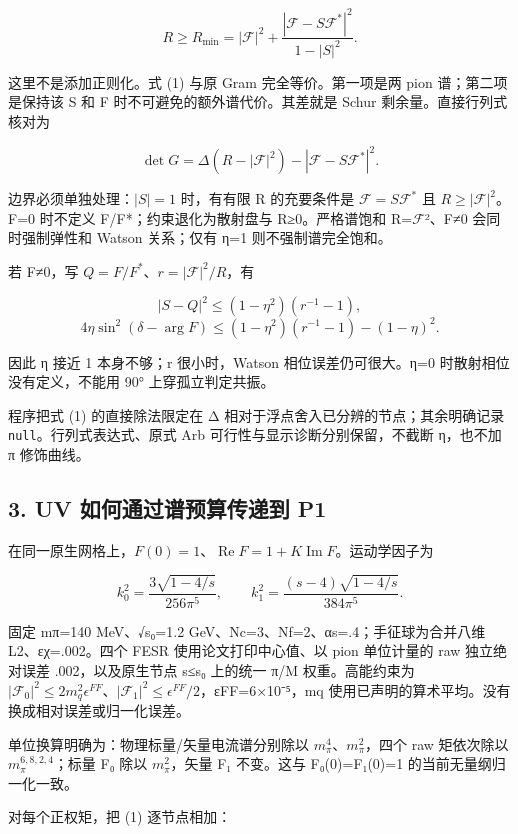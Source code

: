 \documentclass[
  11pt,
  a4paper,
]{article}
\begin{document}
\[
\boxed{R\ge R_{\min}=|\mathcal F|^2+
\frac{|\mathcal F-S\mathcal F^*|^2}{1-|S|^2}.}
\tag{1}
\]

这里不是添加正则化。式 (1) 与原 Gram 完全等价。第一项是两 pion
谱；第二项是保持该 S 和 F 时不可避免的额外谱代价。其差就是 Schur
剩余量。直接行列式核对为

\[
\det G=\Delta(R-|\mathcal F|^2)-|\mathcal F-S\mathcal F^*|^2.
\tag{2}
\]

边界必须单独处理：\(|S|=1\) 时，有有限 R 的充要条件是
\(\mathcal F=S\mathcal F^*\) 且 \(R\ge|\mathcal F|^2\)。F=0 时不定义
F/F*；约束退化为散射盘与 R≥0。严格谱饱和
R=\textbar{}\(\mathcal F\)\textbar²、F≠0 会同时强制弹性和 Watson
关系；仅有 η=1 则不强制谱完全饱和。

若 F≠0，写 \(Q=F/F^*\)、\(r=|\mathcal F|^2/R\)，有

\[
|S-Q|^2\le(1-\eta^2)(r^{-1}-1),
\] \[
4\eta\sin^2(\delta-\arg F)
\le(1-\eta^2)(r^{-1}-1)-(1-\eta)^2.
\tag{3}
\]

因此 η 接近 1 本身不够；r 很小时，Watson 相位误差仍可很大。η=0
时散射相位没有定义，不能用 90° 上穿孤立判定共振。

程序把式 (1) 的直接除法限定在 Δ 相对于浮点舍入已分辨的节点；其余明确记录
\texttt{null}。行列式表达式、原式 Arb 可行性与显示诊断分别保留，不截断
η，也不加 π 修饰曲线。

\subsection{3. UV 如何通过谱预算传递到
P1}\label{uv-ux5982ux4f55ux901aux8fc7ux8c31ux9884ux7b97ux4f20ux9012ux5230-p1}

在同一原生网格上，\(F(0)=1\)、\(\operatorname{Re}F=1+K\operatorname{Im}F\)。运动学因子为

\[
k_0^2=\frac{3\sqrt{1-4/s}}{256\pi^5},\qquad
k_1^2=\frac{(s-4)\sqrt{1-4/s}}{384\pi^5}.
\]

固定 mπ=140 MeV、√s₀=1.2 GeV、Nc=3、Nf=2、αs=.4；手征球为合并八维
L2、εχ=.002。四个 FESR 使用论文打印中心值、以 pion 单位计量的 raw
独立绝对误差 .002，以及原生节点 s≤s₀ 上的统一 π/M 权重。高能约束为
\(|\mathcal F_0|^2\le2m_q^2\epsilon^{FF}\)、\(|\mathcal F_1|^2\le\epsilon^{FF}/2\)，εFF=6×10⁻⁵，mq
使用已声明的算术平均。没有换成相对误差或归一化误差。

单位换算明确为：物理标量/矢量电流谱分别除以
\(m_\pi^4\)、\(m_\pi^2\)，四个 raw 矩依次除以 \(m_\pi^{6,8,2,4}\)；标量
F₀ 除以 \(m_\pi^2\)，矢量 F₁ 不变。这与 F₀(0)=F₁(0)=1
的当前无量纲归一化一致。

对每个正权矩，把 (1) 逐节点相加：
\end{document}
